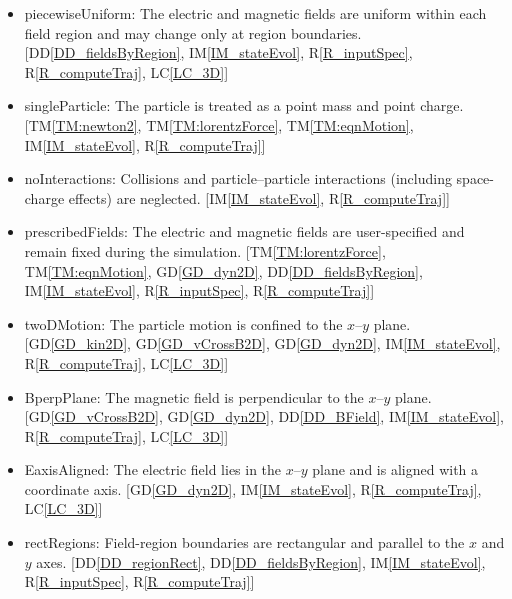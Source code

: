 \documentclass[12pt]{article}
\newcommand{\dref}[1]{GD\ref{#1}}
\newcommand{\ddref}[1]{DD\ref{#1}}
\newcommand{\tref}[1]{TM\ref{#1}}
\newcounter{assumpnum} %
\newcommand{\iref}[1]{IM\ref{#1}}
\newcommand{\rref}[1]{R\ref{#1}}
\newcommand{\lcref}[1]{LC\ref{#1}}
\begin{document}
\begin{itemize}

\item[A\refstepcounter{assumpnum}\theassumpnum \label{A_piecewiseUniform}:]
piecewiseUniform: The electric and magnetic fields are uniform within each field
region and may change only at region boundaries. [\ddref{DD_fieldsByRegion},
\iref{IM_stateEvol}, \rref{R_inputSpec}, \rref{R_computeTraj}, \lcref{LC_3D}]

\item[A\refstepcounter{assumpnum}\theassumpnum \label{A_singleParticle}:]
singleParticle: The particle is treated as a point mass and point charge.
[\tref{TM:newton2}, \tref{TM:lorentzForce}, \tref{TM:eqnMotion}, \iref{IM_stateEvol},
\rref{R_computeTraj}]

\item[A\refstepcounter{assumpnum}\theassumpnum \label{A_noInteractions}:]
noInteractions: Collisions and particle--particle interactions (including
space-charge effects) are neglected. [\iref{IM_stateEvol}, \rref{R_computeTraj}]

\item[A\refstepcounter{assumpnum}\theassumpnum \label{A_prescribedFields}:]
prescribedFields: The electric and magnetic fields are user-specified and remain
fixed during the simulation. [\tref{TM:lorentzForce}, \tref{TM:eqnMotion},
\dref{GD_dyn2D}, \ddref{DD_fieldsByRegion}, \iref{IM_stateEvol}, \rref{R_inputSpec},
\rref{R_computeTraj}]

\item[A\refstepcounter{assumpnum}\theassumpnum \label{A_twoDMotion}:]
twoDMotion: The particle motion is confined to the $x$--$y$ plane.
[\dref{GD_kin2D}, \dref{GD_vCrossB2D}, \dref{GD_dyn2D}, \iref{IM_stateEvol},
\rref{R_computeTraj}, \lcref{LC_3D}]

\item[A\refstepcounter{assumpnum}\theassumpnum \label{A_BperpPlane}:]
BperpPlane: The magnetic field is perpendicular to the $x$--$y$ plane.
[\dref{GD_vCrossB2D}, \dref{GD_dyn2D}, \ddref{DD_BField}, \iref{IM_stateEvol},
\rref{R_computeTraj}, \lcref{LC_3D}]

\item[A\refstepcounter{assumpnum}\theassumpnum \label{A_EaxisAligned}:]
EaxisAligned: The electric field lies in the $x$--$y$ plane and is aligned with a
coordinate axis. [\dref{GD_dyn2D}, \iref{IM_stateEvol}, \rref{R_computeTraj},
\lcref{LC_3D}]

\item[A\refstepcounter{assumpnum}\theassumpnum \label{A_rectRegions}:]
rectRegions: Field-region boundaries are rectangular and parallel to the $x$ and
$y$ axes. [\ddref{DD_regionRect}, \ddref{DD_fieldsByRegion}, \iref{IM_stateEvol},
\rref{R_inputSpec}, \rref{R_computeTraj}]


\end{itemize}
\end{document}
